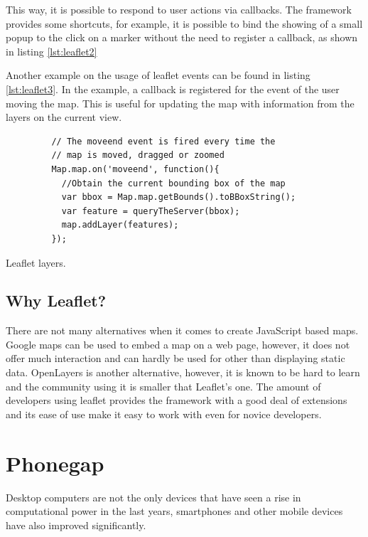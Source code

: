This way, it is possible to respond to user actions via callbacks. The framework provides some shortcuts, for example, it is possible to bind the showing of a small popup to the click on a marker without the need to register a callback, as shown in listing \ref{lst:leaflet2}

Another example on the usage of leaflet events can be found in listing \ref{lst:leaflet3}. In the example, a callback is registered for the event of the user moving the map. This is useful for updating the map with information from the layers on the current view.

\begin{listing}[ht]\centering
  \begin{minipage}{.5\textwidth}
    \begin{verbatim}
	     // The moveend event is fired every time the
	     // map is moved, dragged or zoomed
	     Map.map.on('moveend', function(){
	       //Obtain the current bounding box of the map
	       var bbox = Map.map.getBounds().toBBoxString();
	       var feature = queryTheServer(bbox);
	       map.addLayer(features);
	     });
    \end{verbatim}
  \end{minipage}
  \caption{Leaflet layers.}\label{lst:leaflet3}
\end{listing}

\subsection*{Why Leaflet?}

There are not many alternatives when it comes to create JavaScript based maps. Google maps can be used to embed a map on a web page, however, it does not offer much interaction and can hardly be used for other than displaying static data. OpenLayers is another alternative, however, it is known to be hard to learn and the community using it is smaller that Leaflet's one. The amount of developers using leaflet provides the framework with a good deal of extensions and its ease of use make it easy to work with even for novice developers.

\section{Phonegap}\label{sec:phonegap}

Desktop computers are not the only devices that have seen a rise in computational power in the last years, smartphones and other mobile devices have also improved significantly. 

